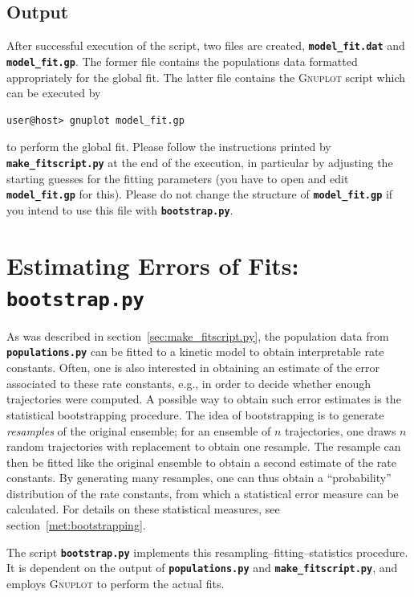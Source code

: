 \documentclass[a4paper,10pt,DIV=15,openany,twoside=false]{scrbook}
\newcommand{\ttt}[1]{\textbf{\texttt{#1}}}
\begin{document}
\subsection{Output}

After successful execution of the script, two files are created, \ttt{model\_fit.dat} and \ttt{model\_fit.gp}.
The former file contains the populations data formatted appropriately for the global fit.
The latter file contains the \textsc{Gnuplot} script which can be executed by
\begin{verbatim}
user@host> gnuplot model_fit.gp
\end{verbatim}
to perform the global fit.
Please follow the instructions printed by \ttt{make\_fitscript.py} at the end of the execution, in particular by adjusting the starting guesses for the fitting parameters (you have to open and edit \ttt{model\_fit.gp} for this).
Please do not change the structure of \ttt{model\_fit.gp} if you intend to use this file with \ttt{bootstrap.py}.



\section{Estimating Errors of Fits: \ttt{bootstrap.py}}\label{sec:bootstrap.py}

As was described in section~\ref{sec:make_fitscript.py}, the population data from \ttt{populations.py} can be fitted to a kinetic model to obtain interpretable rate constants.
Often, one is also interested in obtaining an estimate of the error associated to these rate constants, e.g., in order to decide whether enough trajectories were computed.
A possible way to obtain such error estimates is the statistical bootstrapping procedure.
The idea of bootstrapping is to generate \emph{resamples} of the original ensemble; for an ensemble of $n$ trajectories, one draws $n$ random trajectories with replacement to obtain one resample.
The resample can then be fitted like the original ensemble to obtain a second estimate of the rate constants. 
By generating many resamples, one can thus obtain a ``probability'' distribution of the rate constants, from which a statistical error measure can be calculated.
For details on these statistical measures, see section~\ref{met:bootstrapping}.

The script \ttt{bootstrap.py} implements this resampling--fitting--statistics procedure.
It is dependent on the output of \ttt{populations.py} and \ttt{make\_fitscript.py}, and employs \textsc{Gnuplot} to perform the actual fits.
\end{document}
